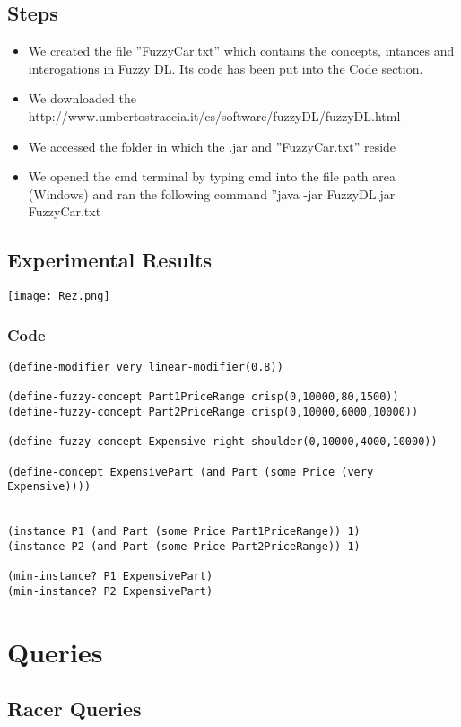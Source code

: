 \documentclass[a4paper,12pt]{report}
\begin{document}
\section{Steps}
\begin{itemize}
    \item We created the file ”FuzzyCar.txt” which contains the concepts, intances and interogations in Fuzzy DL. Its code has been put into the Code section.
    \item We downloaded the 
http://www.umbertostraccia.it/cs/software/fuzzyDL/fuzzyDL.html
    \item We accessed the folder in which the .jar and ”FuzzyCar.txt” reside
    \item We opened the cmd terminal by typing cmd into the file path area (Windows) and ran the following command ”java -jar FuzzyDL.jar FuzzyCar.txt
\end{itemize}

\section{Experimental Results}
\texttt{[image: Rez.png]}

\subsection{Code}
\begin{lstlisting}[language=LISP]
(define-modifier very linear-modifier(0.8))

(define-fuzzy-concept Part1PriceRange crisp(0,10000,80,1500))
(define-fuzzy-concept Part2PriceRange crisp(0,10000,6000,10000))

(define-fuzzy-concept Expensive right-shoulder(0,10000,4000,10000))

(define-concept ExpensivePart (and Part (some Price (very Expensive)))) 


(instance P1 (and Part (some Price Part1PriceRange)) 1)
(instance P2 (and Part (some Price Part2PriceRange)) 1)

(min-instance? P1 ExpensivePart)
(min-instance? P2 ExpensivePart)
\end{lstlisting}

\chapter{Queries}
\section{Racer Queries}
\begin{center}
\end{center}
\end{document}
